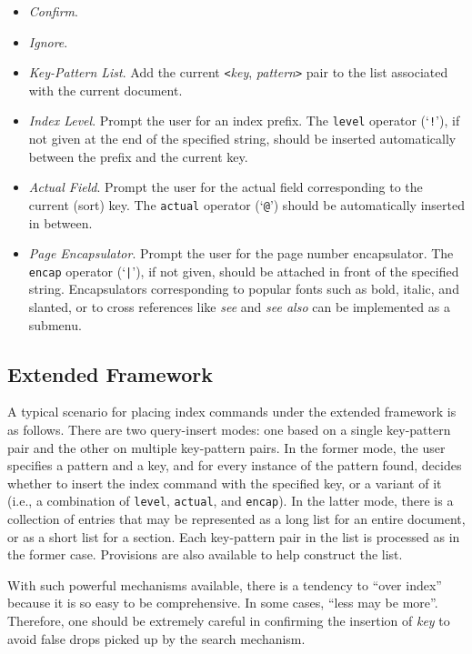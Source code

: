\begin{itemize}
  \item {\it Confirm\/}.
  \item {\it Ignore\/}.
  \item {\it Key-Pattern List\/}.  Add the current
	\verb|<|{\it key\/}, {\it pattern\/}\verb|>| pair to the list
	associated with the current document.
  \item {\it Index Level\/}.  Prompt the user for an index prefix.
	The \verb|level| operator (`\verb|!|'), if not given at the end
	of the specified string, should be inserted automatically between
	the prefix and the current key.
  \item {\it Actual Field\/}.  Prompt the user for the actual field
	corresponding to the current (sort) key.  The \verb|actual|
	operator (`\verb|@|') should be automatically inserted in between.
  \item {\it Page Encapsulator\/}.  Prompt the user for the page
	number encapsulator.  The \verb|encap| operator (`\verb#|#'),
	if not given, should be attached in front of the specified string.
	Encapsulators corresponding to popular fonts such as bold, italic,
	and slanted, or to cross references like {\it see\/} and
	{\it see also\/} can be implemented as a submenu.
\end{itemize}

\subsection{Extended Framework}
A typical scenario for placing index commands under the extended framework
is as follows.  There are two query-insert modes:
one based on a single key-pattern pair and the other
on multiple key-pattern pairs.
In the former mode, the user specifies a pattern and a key, and for
every instance of the pattern found, decides whether to insert the
index command with the specified key, or a variant of it (i.e., a combination
of \verb|level|, \verb|actual|, and \verb|encap|).
In the latter mode, there is a collection of entries that may be represented
as a long list for an entire document, or as a short list for a section.
Each key-pattern pair in the list is processed as in the former case.
Provisions are also available to help construct the list.

With such powerful mechanisms available, there is a tendency to ``over index''
because it is so easy to be comprehensive.
In some cases, ``less may be more''.  Therefore, one should be extremely
careful in confirming the insertion of {\it key\/}
to avoid false drops picked up by the search mechanism.


